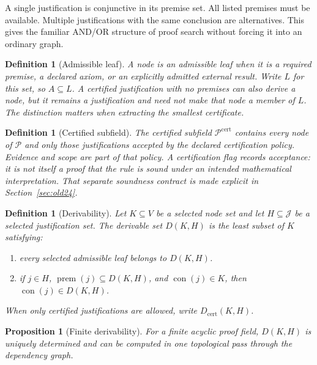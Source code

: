 \documentclass[11pt,oneside]{article}
\theoremstyle{komorebiplain}
\newtheorem{proposition}[theorem]{Proposition}
\theoremstyle{komorebidefinition}
\newtheorem{definition}[theorem]{Definition}
\theoremstyle{komorebiremark}
\newcommand{\Pcal}{\mathcal P}
\newcommand{\Jcal}{\mathcal J}
\begin{document}
A single justification is conjunctive in its premise set. All listed premises must be available. Multiple justifications with the same conclusion are alternatives. This gives the familiar AND/OR structure of proof search without forcing it into an ordinary graph.

\begin{definition}[Admissible leaf]
\label{res:3:2}
A node is an admissible leaf when it is a required premise, a declared axiom, or an explicitly admitted external result. Write $L$ for this set, so $A\subseteq L$. A certified justification with no premises can also derive a node, but it remains a justification and need not make that node a member of $L$. The distinction matters when extracting the smallest certificate.
\end{definition}

\begin{definition}[Certified subfield]
\label{res:3:3}
The certified subfield $\Pcal^{\mathrm{cert}}$ contains every node of $\Pcal$ and only those justifications accepted by the declared certification policy. Evidence and scope are part of that policy. A certification flag records acceptance: it is not itself a proof that the rule is sound under an intended mathematical interpretation. That separate soundness contract is made explicit in Section~\ref{sec:old24}.
\end{definition}

\begin{definition}[Derivability]
\label{res:3:4}
Let $K\subseteq V$ be a selected node set and let $H\subseteq\Jcal$ be a selected justification set. The derivable set $D(K,H)$ is the least subset of $K$ satisfying:
\begin{enumerate}[label=\textup{(\roman*)}]
\item every selected admissible leaf belongs to $D(K,H)$.
\item if $j\in H$, $\operatorname{prem}(j)\subseteq D(K,H)$, and $\operatorname{con}(j)\in K$, then $\operatorname{con}(j)\in D(K,H)$.
\end{enumerate}
When only certified justifications are allowed, write $D_{\mathrm{cert}}(K,H)$.
\end{definition}

\begin{proposition}[Finite derivability]
\label{res:3:5}
For a finite acyclic proof field, $D(K,H)$ is uniquely determined and can be computed in one topological pass through the dependency graph.
\end{proposition}
\end{document}
